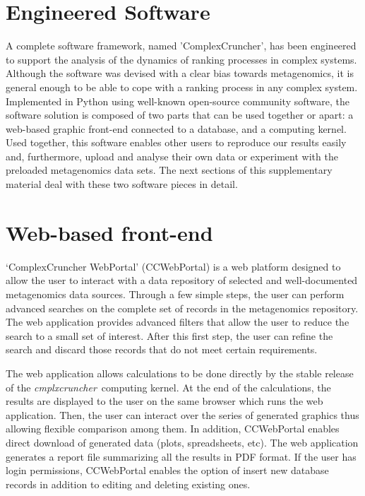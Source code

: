 \documentclass[12pt]{article}
\newcommand{\CC}[0]{\emph{cmplxcruncher}}
\begin{document}
\section{Engineered Software}

A complete software framework, named 'ComplexCruncher', has been engineered to support the analysis of the dynamics of ranking processes in complex systems. Although the software was devised with a clear bias towards metagenomics, it is general enough to be able to cope with a ranking process in any complex system. Implemented in Python using well-known open-source community software, the software solution is composed of two parts that can be used together or apart: a web-based graphic front-end connected to a database, and a computing kernel. Used together, this software enables other users to reproduce our results easily and, furthermore, upload and analyse their own data or experiment with the preloaded metagenomics data sets. The next sections of this supplementary material deal with these two software pieces in detail.

\section{Web-based front-end}

`ComplexCruncher WebPortal' (CCWebPortal) is a web platform designed to allow the user to interact with a data repository of selected and well-documented metagenomics data sources. Through a few simple steps, the user can perform advanced searches on the complete set of records in the metagenomics repository.  The web application provides advanced filters that allow the user to reduce the search to a small set of interest. After this first step, the user can refine the search and discard those records that do not meet certain requirements.

The web application allows calculations to be done directly by the stable release of the \CC\ computing kernel. At the end of the calculations, the results are displayed to the user on the same browser which runs the web application. Then, the user can interact over the series of generated graphics thus allowing flexible comparison among them. In addition, CCWebPortal enables direct download of generated data (plots, spreadsheets, etc). The web application generates a report file summarizing all the results in PDF format. If the user has login permissions, CCWebPortal enables the option of insert new database records in addition to editing and deleting existing ones.
\end{document}
